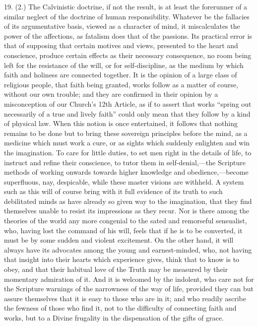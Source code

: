 19. (2.) The Calvinistic doctrine, if not the result, is at least
the forerunner of a similar neglect of the doctrine of human
responsibility. Whatever be the fallacies of its argumentative basis,
viewed as a character of mind, it miscalculates the power of the
affections, as fatalism does that of the passions. Its practical error
is that of supposing that certain motives and views, presented to the
heart and conscience, produce certain effects as their necessary
consequence, no room being left for the resistance of the will, or for
self-discipline, as the medium by which faith and holiness are
connected together. It is the opinion of a large class of religious
people, that faith being granted, works follow as a matter of course,
without our own trouble; and they are confirmed in their opinion by a
misconception of our Church's 12th Article, as if to assert that works
``spring out necessarily of a true and lively faith'' could
only mean that they follow by a kind of physical law. When this notion
is once entertained, it follows that nothing remains to be done but to
bring these sovereign principles before the mind, as a medicine which
must work a cure, or as sights which suddenly enlighten and win the
imagination. To care for little duties, to set men right in the
details of life, to instruct and refine their conscience, to tutor
them in self-denial,—the Scripture methods of working onwards
towards higher knowledge and obedience,—become superfluous, nay,
despicable, while these master visions are withheld. A system such as
this will of course bring with it full evidence of its truth to such
debilitated minds as have already so given way to the imagination,
that they find themselves unable to resist its impressions as they
recur. Nor is there among the theories of the world any more congenial
to the sated and remorseful sensualist, who, having lost the command
of his will, feels that if he is to be converted, it must be by some
sudden and violent excitement. On the other hand, it will always have
its advocates among the young and earnest-minded, who, not having that
insight into their hearts which experience gives, think that to know
is to obey, and that their habitual love of the Truth may be measured
by their momentary admiration of it. And it is welcomed by the
indolent, who care not for the Scripture warnings of the narrowness of
the way of life, provided they can but assure themselves that it is
easy to those who are in it; and who readily ascribe the fewness of
those who find it, not to the difficulty of connecting faith and
works, but to a Divine frugality in the dispensation of the gifts of
grace.


